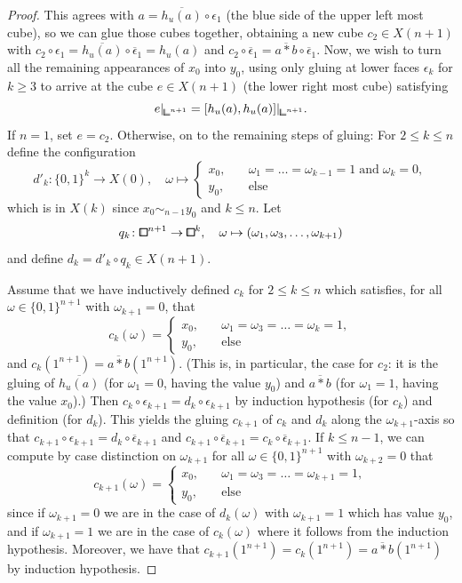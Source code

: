 \begin{proof}
This agrees with $a = \overline{h_u(a)}\circ\epsilon_1$ (the blue side of the upper left most cube),
so we can glue those cubes together, obtaining a new cube $c_2\in X(n+1)$ with
$c_2\circ\epsilon_1 = \overline{h_u(a)}\circ\overline{\epsilon}_1 = h_u(a)$
and $c_2\circ\overline{\epsilon}_1 = \overline{a*b}\circ\overline{\epsilon}_1$.
Now, we wish to turn all the remaining appearances of $x_0$ into $y_0$,
using only gluing at lower faces $\epsilon_k$ for $k\geq 3$ to arrive at the cube $e\in X(n+1)$
(the lower right most cube) satisfying
\[
    e\rvert_{{\bbcor}^{n+1}} = [h_u(a),h_u(a)]\rvert_{{\bbcor}^{n+1}}.
\]
If $n=1$, set $e=c_2$.
Otherwise, on to the remaining steps of gluing:
For $2\leq k\leq n$ define the configuration
\[
    d'_k\colon\{0,1\}^k\to X(0),\quad\omega\mapsto\begin{cases}
        x_0,\quad & \omega_1=\ldots=\omega_{k-1}=1\;\text{and}\;\omega_k=0, \\
        y_0,\quad & \text{else}
    \end{cases}
\]
which is in $X(k)$ since $x_0\sim_{n-1}y_0$ and $k\leq n$.
Let
\[
    q_{k}\colon{\bbox}^{n+1}\to{\bbox}^{k},\quad \omega\mapsto (\omega_1,\omega_3,\ldots,\omega_{k+1})
\]
and define $d_k = d'_k\circ q_k\in X(n+1)$.

Assume that we have inductively defined $c_k$ for $2\leq k\leq n$
which satisfies, for all $\omega\in\{0,1\}^{n+1}$ with $\omega_{k+1}=0$, that
\[
    c_k(\omega) = \begin{cases}
        x_0,\quad &\omega_1=\omega_3=\ldots=\omega_k = 1, \\
        y_0,\quad & \text{else}
    \end{cases}
\]
and $c_k(1^{n+1}) = \overline{a*b}(1^{n+1})$.
(This is, in particular, the case for $c_2$: it is the gluing
of $\overline{h_{u}(a)}$ (for $\omega_1 = 0$, having the value $y_0$)
and $\overline{a*b}$ (for $\omega_1 = 1$, having the value $x_0$).)
Then $c_k\circ\epsilon_{k+1} = d_k\circ\epsilon_{k+1}$ by induction hypothesis (for $c_k$)
and definition (for $d_k$).
This yields the gluing $c_{k+1}$ of $c_k$ and $d_k$ along the $\omega_{k+1}$-axis
so that $c_{k+1}\circ\epsilon_{k+1} = d_k\circ\overline{\epsilon}_{k+1}$
and $c_{k+1}\circ\overline{\epsilon}_{k+1} = c_k\circ\overline{\epsilon}_{k+1}$.
If $k\leq n-1$, we can compute by case distinction on $\omega_{k+1}$
for all $\omega\in\{0,1\}^{n+1}$ with $\omega_{k+2}=0$ that
\[
    c_{k+1}(\omega) = \begin{cases}
        x_0,\quad &\omega_1=\omega_3=\ldots=\omega_{k+1} = 1, \\
        y_0,\quad & \text{else}
    \end{cases}
\]
since if $\omega_{k+1}=0$ we are in the case of $d_k(\omega)$ with $\omega_{k+1}=1$
which has value $y_0$,
and if $\omega_{k+1}=1$ we are in the case of $c_k(\omega)$ where it follows from the induction hypothesis.
Moreover, we have that $c_{k+1}(1^{n+1}) = c_k(1^{n+1}) = \overline{a*b}(1^{n+1})$
by induction hypothesis.


\end{proof}

